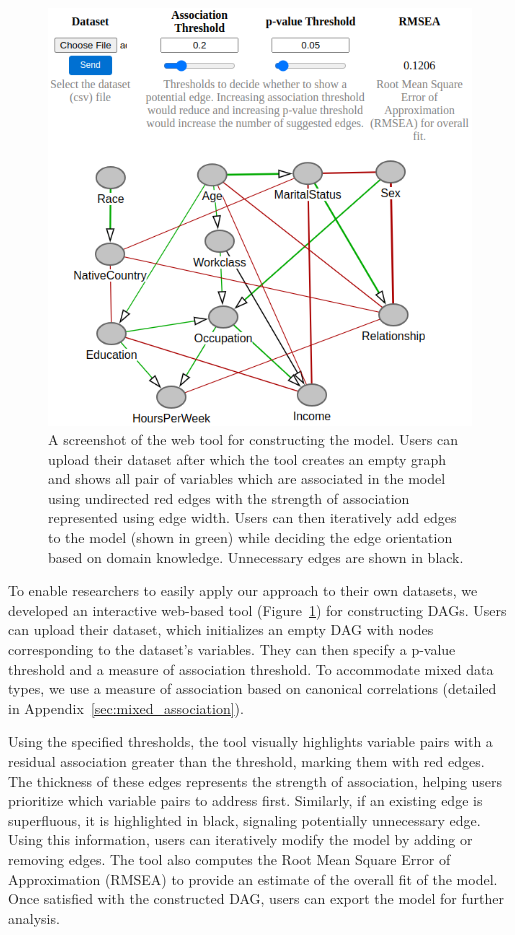 \documentclass{uai2025} %
\begin{document}
\begin{figure}[t!]
	\centering
	\includegraphics[scale=0.4]{../code/plots/web_tool_full_new.png}
	\caption{A screenshot of the web tool for constructing the model. Users
		can upload their dataset after which the tool creates an empty
		graph and shows all pair of variables which are associated in
		the model using undirected red edges with the strength of
		association represented using edge width. Users can then
		iteratively add edges to the model (shown in green) while
		deciding the edge orientation based on domain knowledge.
		Unnecessary edges are shown in black.}
	\label{fig:web}
\end{figure}

To enable researchers to easily apply our approach to their own datasets, we
developed an interactive web-based tool (Figure~\ref{fig:web}) for constructing
DAGs. Users can upload their dataset, which initializes an empty DAG with nodes
corresponding to the dataset's variables. They can then specify a p-value
threshold and a measure of association threshold. To accommodate mixed data
types, we use a measure of association based on canonical correlations
(detailed in Appendix~\ref{sec:mixed_association}). 

Using the specified thresholds, the tool visually highlights variable pairs
with a residual association greater than the threshold, marking them with red
edges. The thickness of these edges represents the strength of association,
helping users prioritize which variable pairs to address first. Similarly, if
an existing edge is superfluous, it is highlighted in black, signaling
potentially unnecessary edge. Using this information, users can iteratively
modify the model by adding or removing edges. The tool also computes the Root
Mean Square Error of Approximation (RMSEA) to provide an estimate of the
overall fit of the model. Once satisfied with the constructed DAG, users can
export the model for further analysis.
\end{document}
